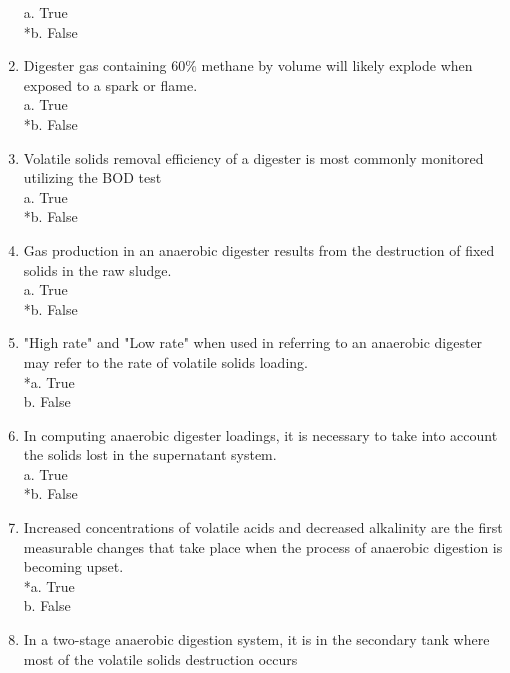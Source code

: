 \documentclass{article}
\begin{document}
\begin{enumerate}
a. True \\
*b. False \\

\item  Digester gas containing 60\% methane by volume will likely explode when exposed to a spark or flame. \\

a. True \\
*b. False \\

\item  Volatile solids removal efficiency of a digester is most commonly monitored utilizing the BOD test\\

a. True \\
*b. False \\

\item  Gas production in an anaerobic digester results from the destruction of fixed solids in the raw sludge. \\

a. True \\
*b. False \\

\item  "High rate" and "Low rate" when used in referring to an anaerobic digester may refer to the rate of volatile solids loading. \\

*a. True \\
b. False \\

\item  In computing anaerobic digester loadings, it is necessary to take into account the solids lost in the supernatant system. \\

a. True \\
*b. False \\

\item  Increased concentrations of volatile acids and decreased alkalinity are the first measurable changes that take place when the process of anaerobic digestion is becoming upset. \\

*a. True \\
b. False \\

\item  In a two-stage anaerobic digestion system, it is in the secondary tank where most of the volatile solids destruction occurs \\


\end{enumerate}
\end{document}
